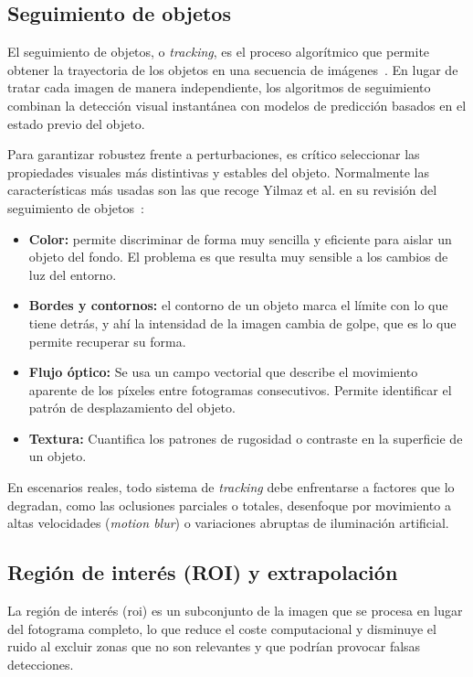 \subsection{Seguimiento de objetos}
\label{sec:seguimiento}

El seguimiento de objetos, o \textit{tracking}, es el proceso algorítmico que permite obtener la trayectoria de los objetos en una secuencia de imágenes~\cite{yilmaz2006}. En lugar de tratar cada imagen de manera independiente, los algoritmos de seguimiento combinan la detección visual instantánea con modelos de predicción basados en el estado previo del objeto.

Para garantizar robustez frente a perturbaciones, es crítico seleccionar las propiedades visuales más distintivas y estables del objeto. Normalmente las características más usadas son las que recoge Yilmaz et al. en su revisión del seguimiento de objetos~\cite{yilmaz2006}:

\begin{itemize}
    \item \textbf{Color:} permite discriminar de forma muy sencilla y eficiente para aislar un objeto del fondo. El problema es que resulta muy sensible a los cambios de luz del entorno.
    \item \textbf{Bordes y contornos:} el contorno de un objeto marca el límite con lo que tiene detrás, y ahí la intensidad de la imagen cambia de golpe, que es lo que permite recuperar su forma.
    \item \textbf{Flujo óptico:} Se usa un campo vectorial que describe el movimiento aparente de los píxeles entre fotogramas consecutivos. Permite identificar el patrón de desplazamiento del objeto. 
    \item \textbf{Textura:} Cuantifica los patrones de rugosidad o contraste en la superficie de un objeto.
\end{itemize}

En escenarios reales, todo sistema de \textit{tracking} debe enfrentarse a factores que lo degradan, como las oclusiones parciales o totales, desenfoque por movimiento a altas velocidades (\textit{motion blur}) o variaciones abruptas de iluminación artificial.

\subsection{Región de interés (ROI) y extrapolación}
\label{sec:roi}

La región de interés (\gls{roi}) es un subconjunto de la imagen que se procesa en lugar del fotograma completo, lo que reduce el coste computacional y disminuye el ruido al excluir zonas que no son relevantes y que podrían provocar falsas detecciones.

